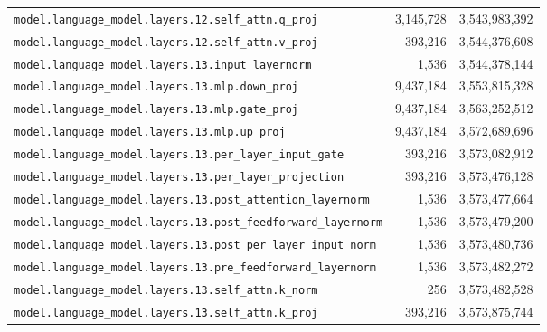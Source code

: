 \documentclass[10pt,a4paper]{article}
\theoremstyle{definition}
\begin{document}
\begin{appendices}
\begin{longtable}{p{9.5cm}rr}
\texttt{model.\allowbreak{}language\_model.\allowbreak{}layers.\allowbreak{}12.\allowbreak{}self\_attn.\allowbreak{}q\_proj} & 3,145,728 & 3,543,983,392 \\
\texttt{model.\allowbreak{}language\_model.\allowbreak{}layers.\allowbreak{}12.\allowbreak{}self\_attn.\allowbreak{}v\_proj} & 393,216 & 3,544,376,608 \\
\texttt{model.\allowbreak{}language\_model.\allowbreak{}layers.\allowbreak{}13.\allowbreak{}input\_layernorm} & 1,536 & 3,544,378,144 \\
\texttt{model.\allowbreak{}language\_model.\allowbreak{}layers.\allowbreak{}13.\allowbreak{}mlp.\allowbreak{}down\_proj} & 9,437,184 & 3,553,815,328 \\
\texttt{model.\allowbreak{}language\_model.\allowbreak{}layers.\allowbreak{}13.\allowbreak{}mlp.\allowbreak{}gate\_proj} & 9,437,184 & 3,563,252,512 \\
\texttt{model.\allowbreak{}language\_model.\allowbreak{}layers.\allowbreak{}13.\allowbreak{}mlp.\allowbreak{}up\_proj} & 9,437,184 & 3,572,689,696 \\
\texttt{model.\allowbreak{}language\_model.\allowbreak{}layers.\allowbreak{}13.\allowbreak{}per\_layer\_input\_gate} & 393,216 & 3,573,082,912 \\
\texttt{model.\allowbreak{}language\_model.\allowbreak{}layers.\allowbreak{}13.\allowbreak{}per\_layer\_projection} & 393,216 & 3,573,476,128 \\
\texttt{model.\allowbreak{}language\_model.\allowbreak{}layers.\allowbreak{}13.\allowbreak{}post\_attention\_layernorm} & 1,536 & 3,573,477,664 \\
\texttt{model.\allowbreak{}language\_model.\allowbreak{}layers.\allowbreak{}13.\allowbreak{}post\_feedforward\_layernorm} & 1,536 & 3,573,479,200 \\
\texttt{model.\allowbreak{}language\_model.\allowbreak{}layers.\allowbreak{}13.\allowbreak{}post\_per\_layer\_input\_norm} & 1,536 & 3,573,480,736 \\
\texttt{model.\allowbreak{}language\_model.\allowbreak{}layers.\allowbreak{}13.\allowbreak{}pre\_feedforward\_layernorm} & 1,536 & 3,573,482,272 \\
\texttt{model.\allowbreak{}language\_model.\allowbreak{}layers.\allowbreak{}13.\allowbreak{}self\_attn.\allowbreak{}k\_norm} & 256 & 3,573,482,528 \\
\texttt{model.\allowbreak{}language\_model.\allowbreak{}layers.\allowbreak{}13.\allowbreak{}self\_attn.\allowbreak{}k\_proj} & 393,216 & 3,573,875,744 \\

\end{longtable}
\end{appendices}
\end{document}
